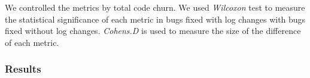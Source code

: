 %
%
%
%
%
%
%

We controlled the metrics by total code churn. We used \textsl{Wilcoxon} test to measure the statistical significance of each metric in bugs fixed with log changes with bugs fixed without log changes. \textsl{Cohens.D} is used to measure the size of the difference of each metric. 



\subsubsection*{\textbf{Results}}

